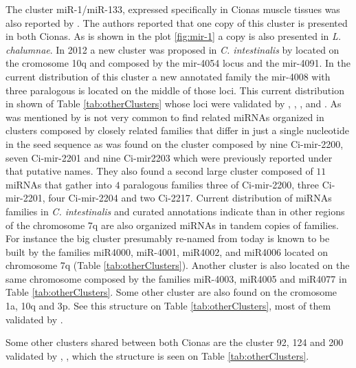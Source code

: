 \documentclass[graybox]{svmult}
\begin{document}
The cluster miR-1/miR-133, expressed specifically in Cionas muscle tissues was 
also reported by \cite{Kusakabe2013}. The authors reported that one copy of this 
cluster is presented in both Cionas. As is shown in the plot 
\ref{fig:mir-1} a copy is also presented in \textit{L. chalumnae}. In 2012 a 
new cluster was proposed in \textit{C. intestinalis} by \cite{Terai2012} located 
on the cromosome 10q and composed by the mir-4054 locus and the mir-4091. In 
the current distribution of this cluster a new annotated family the mir-4008 
with three paralogous is located on the middle of those loci. This current 
distribution in shown of Table \ref{tab:otherClusters} whose loci were  
validated by \cite{Norden-Krichmar2007}, \cite{Fu2008}, \cite{Hendrix2010}, and 
\cite{Terai2012}. As was mentioned by \cite{Hendrix2010} is not very common to 
find related miRNAs organized in clusters composed by closely related families 
that differ in just a single nucleotide in the seed sequence as was found on the 
cluster composed by nine Ci-mir-2200, seven Ci-mir-2201 and nine Ci-mir2203 
which were previously reported under that putative names. They also found a 
second large cluster composed of $11$ miRNAs that gather into $4$ paralogous 
families three of Ci-mir-2200, three Ci-mir-2201, four Ci-mir-2204 and two 
Ci-2217. Current distribution of miRNAs families in \textit{C. intestinalis} and 
curated annotations indicate than in other regions of the chromosome 7q are also 
organized miRNAs in tandem copies of families. For instance the big cluster 
presumably re-named from \cite{Hendrix2010} today is known to be built by the 
families miR4000, miR-4001, miR4002, and miR4006 located on chromosome 7q 
(Table \ref{tab:otherClusters}). Another cluster is also located on the same 
chromosome composed by the families miR-4003, miR4005 and miR4077 in Table 
\ref{tab:otherClusters}. Some other cluster are also found on the cromosome 1a, 
10q and 3p. See this structure on Table \ref{tab:otherClusters}, most 
of them validated by \cite{Hendrix2010}. 


Some other clusters shared between both Cionas are the cluster 92, 124 and 200  
validated by \cite{Norden-Krichmar2007}, \cite{Fu2008}, \cite{Hendrix2010} which 
the structure is seen on Table \ref{tab:otherClusters}.    

\end{document}
